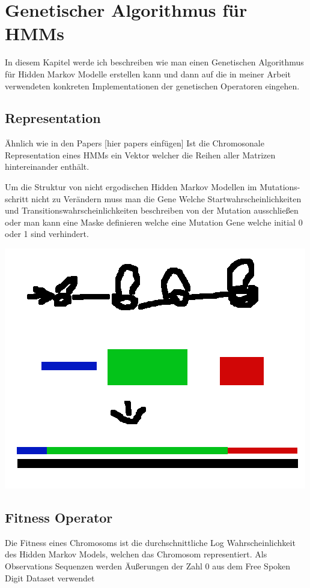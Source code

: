 \section{Genetischer Algorithmus für HMMs}

In diesem Kapitel werde ich beschreiben wie man einen Genetischen Algorithmus 
für Hidden Markov Modelle erstellen kann und dann auf die in meiner Arbeit verwendeten 
konkreten Implementationen der genetischen Operatoren eingehen.

\subsection*{Representation}
Ähnlich wie in den Papers [hier papers einfügen] 
Ist die Chromosonale Representation eines HMMs ein Vektor welcher 
die Reihen aller Matrizen hintereinander enthält.

Um die Struktur von nicht ergodischen Hidden Markov Modellen im Mutations-schritt nicht zu Verändern 
muss man die Gene Welche Startwahrscheinlichkeiten und Transitionswahrscheinlichkeiten
beschreiben von der Mutation ausschließen oder man kann eine Maske definieren
welche eine Mutation Gene welche initial 0 oder 1 sind verhindert.


\includegraphics[scale=1.0]{images/Hmm_Chromosom_Representation.png}


\subsection*{Fitness Operator}
Die Fitness eines Chromosoms ist die durchschnittliche Log Wahrscheinlichkeit 
des Hidden Markov Models, welchen das Chromosom representiert.
Als Observations Sequenzen werden Äußerungen der Zahl 0 aus dem Free Spoken Digit Dataset verwendet

